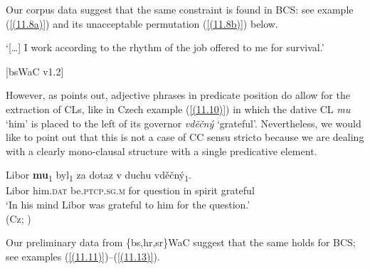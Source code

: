 \noindent Our corpus data suggest that the same constraint is found in BCS: see example (\ref{(11.8a)}) and its unacceptable permutation (\ref{(11.8b)}) below.

\begin{exe}\ex
\begin{xlist}
\end{xlist}
\glt‘[\dots] I work according to the rhythm of the job offered to me for survival.’ \\
\strut\hfill [bsWaC v1.2]
\end{exe}

\noindent However, as \citet[72]{Junghanns02} points out, adjective phrases in predicate position do allow for the extraction of CLs, like in Czech example (\ref{(11.10)}) in which the dative CL \textit{mu} ‘him’ is placed to the left of its governor \textit{vděčný} ‘grateful’. Nevertheless, we would like to point out that this is not a case of CC sensu stricto because we are dealing with a clearly mono-clausal structure with a single predicative element.

\begin{exe}\ex\label{(11.10)}
\gll Libor \textbf{mu}\textsubscript{1} byl\textsubscript{1} za dotaz v duchu vděčný\textsubscript{1}.\\
Libor him.\textsc{dat} be.\textsc{ptcp}.\textsc{sg}.\textsc{m} for question in spirit grateful \\
\glt ‘In his mind Libor was grateful to him for the question.’ \\
\hfill (Cz; \citealt[72]{Junghanns02})
\end{exe}

\noindent Our preliminary data from \{bs,hr,sr\}WaC suggest that the same holds for BCS; see examples (\ref{(11.11)})--(\ref{(11.13)}). 

